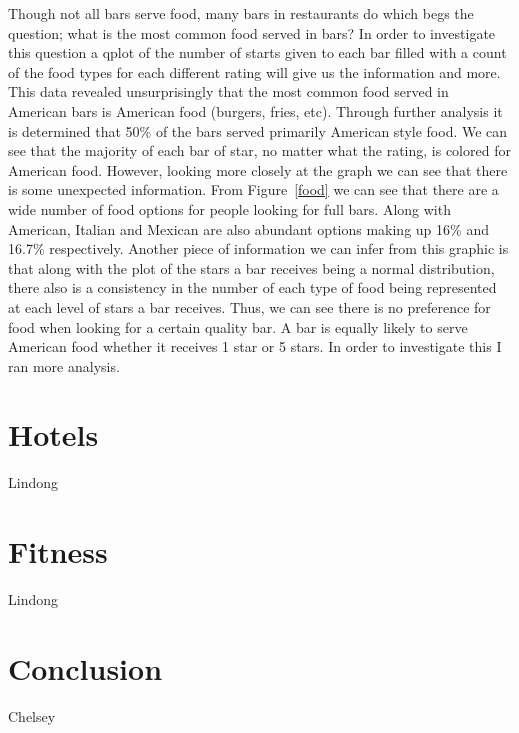 \documentclass[11pt]{article}
\begin{document}
Though not all bars serve food, many bars in restaurants do which begs the question; what is the most common food served in bars?  In order to investigate this question a qplot of the number of starts given to each bar filled with a count of the food types for each different rating will give us the information and more.  This data revealed unsurprisingly that the most common food served in American bars is American food (burgers, fries, etc). Through further analysis it is determined that 50$\%$ of the bars served primarily American style food.  We can see that the majority of each bar of star, no matter what the rating, is colored for American food.  However, looking more closely at the graph we can see that there is some unexpected information.  From Figure~\ref{food} we can see that there are a wide number of food options for people looking for full bars.  Along with American, Italian and Mexican are also abundant options making up 16$\%$ and 16.7$\%$ respectively.  Another piece of information we can infer from this graphic is that along with the plot of the stars a bar receives being a normal distribution, there also is a consistency in the number of each type of food being represented at each level of stars a bar receives.  Thus, we can see there is no preference for food when looking for a certain quality bar. A bar is equally likely to serve American food whether it receives 1 star or 5 stars.  In order to investigate this I ran more analysis.  





\section{Hotels}

Lindong

\section{Fitness}

Lindong


\section{Conclusion}


Chelsey
\end{document}
